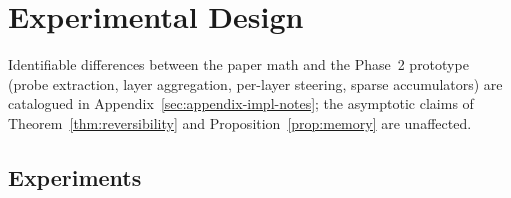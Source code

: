 \section{Experimental Design}
\label{sec:experiments}

Identifiable differences between the paper math and the Phase~2 prototype (probe extraction, layer aggregation, per-layer steering, sparse accumulators) are catalogued in Appendix~\ref{sec:appendix-impl-notes}; the asymptotic claims of Theorem~\ref{thm:reversibility} and Proposition~\ref{prop:memory} are unaffected.


\subsection{Experiments}

